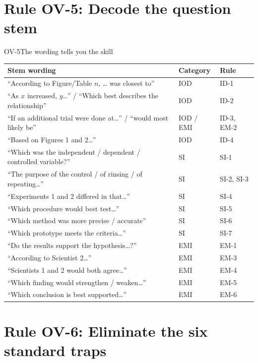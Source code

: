\documentclass[11pt]{article}
\begin{document}
\section{Rule OV-5: Decode the question stem}

\begin{rulebox}{OV-5}{The wording tells you the skill}
\small
\renewcommand{\arraystretch}{1.12}
\begin{tabularx}{\linewidth}{@{}>{\raggedright\arraybackslash}X l l@{}}
Stem wording & Category & Rule\\\midrule
``According to Figure/Table $n$, \ldots{} was closest to'' & IOD & ID-1\\
``As $x$ increased, $y$\ldots'' / ``Which best describes the relationship'' & IOD & ID-2\\
``If an additional trial were done at\ldots'' / ``would most likely be'' & IOD / EMI & ID-3, EM-2\\
``Based on Figures 1 and 2\ldots'' & IOD & ID-4\\
``Which was the independent / dependent / controlled variable?'' & SI & SI-1\\
``The purpose of the control / of rinsing / of repeating\ldots'' & SI & SI-2, SI-3\\
``Experiments 1 and 2 differed in that\ldots'' & SI & SI-4\\
``Which procedure would best test\ldots'' & SI & SI-5\\
``Which method was more precise / accurate'' & SI & SI-6\\
``Which prototype meets the criteria\ldots'' & SI & SI-7\\
``Do the results support the hypothesis\ldots?'' & EMI & EM-1\\
``According to Scientist 2\ldots'' & EMI & EM-3\\
``Scientists 1 and 2 would both agree\ldots'' & EMI & EM-4\\
``Which finding would strengthen / weaken\ldots'' & EMI & EM-5\\
``Which conclusion is best supported\ldots'' & EMI & EM-6\\
\end{tabularx}
\end{rulebox}

\section{Rule OV-6: Eliminate the six standard traps}
\end{document}
